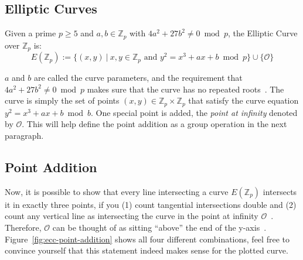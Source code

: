 \subsection{Elliptic Curves}

\begin{definition}
    Given a prime $p \geq 5$ and $a, b \in \mathbb{Z}_p$ with $4a^2 + 27b^2 \neq 0 \bmod{p}$, the Elliptic Curve over $\mathbb{Z}_p$ is:~\cite{katz_introduction_2015}
    \begin{equation}
        E(\mathbb{Z}_p) := \{(x, y)~|~x,y \in \mathbb{Z}_p \text{ and } y^2 = x^3 + a x + b \bmod{p}\} \cup \{\mathcal{O}\}
    \end{equation}
\end{definition}

$a$ and $b$ are called the curve parameters, and the requirement that $4a^2 + 27b^2 \neq 0 \bmod{p}$ makes sure that the curve has no repeated roots~\cite{katz_introduction_2015}.
The curve is simply the set of points $(x, y) \in \mathbb{Z}_p \times \mathbb{Z}_p$ that satisfy the curve equation $y^2 = x^3 + a x + b \bmod{b}$.
One special point is added, the \emph{point at infinity} denoted by $\mathcal{O}$. This will help define the point addition as a group operation in the next paragraph.~\cite{katz_introduction_2015}

\subsection{Point Addition}
Now, it is possible to show that every line intersecting a curve $E(\mathbb{Z}_p)$ intersects it in exactly three points, if you (1) count tangential intersections double and (2) count any vertical line as intersecting the curve in the point at infinity $\mathcal{O}$~\cite{katz_introduction_2015}.
Therefore, $\mathcal{O}$ can be thought of as sitting ``above'' the end of the y-axis~\cite{katz_introduction_2015}.
Figure~\ref{fig:ecc-point-addition} shows all four different combinations, feel free to convince yourself that this statement indeed makes sense for the plotted curve.

